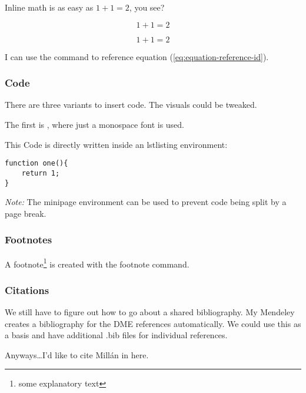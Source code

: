 Inline math is as easy as $1 + 1 = 2$, you see?

\[
    1 + 1 = 2
\]

\begin{equation}
    1 + 1 = 2
    \label{eq:equation-reference-id}
\end{equation}

I can use the  command to reference equation (\ref{eq:equation-reference-id}).


\subsubsection{Code}
There are three variants to insert code. The visuals could be tweaked.

The first is , where just a monospace font is used.

This Code is directly written inside an lstlisting environment:
\begin{lstlisting}
function one(){
    return 1;
}
\end{lstlisting}

\begin{minipage}{\textwidth}{
\emph{Note:} The minipage environment can be used to prevent code being split by a page break.
}
\end{minipage}


\subsubsection{Footnotes}

A footnote\footnote{some explanatory text} is created with the footnote command.


\subsubsection{Citations}
We still have to figure out how to go about a shared bibliography.
My Mendeley creates a bibliography for the DME references automatically.
We could use this as a basis and have additional .bib files for individual references.

Anyways\ldots I'd like to cite Millán \cite{Millan2004} in here.

